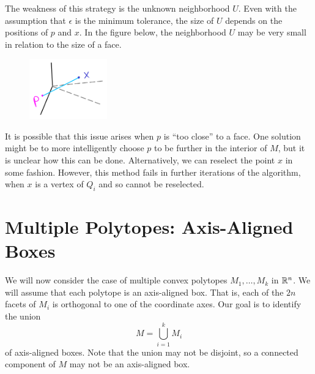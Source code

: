 \documentclass[12pt]{article}
\begin{document}
\begin{flushleft}
The weakness of this strategy is the unknown neighborhood $U$.
Even with the assumption that $\epsilon$ is the minimum tolerance, the size of $U$ depends on the positions of $p$ and $x$.
In the figure below, the neighborhood $U$ may be very small in relation to the size of a face.
\begin{figure}[H]
	\centering
	\includegraphics[width=0.3\textwidth]{epsilon_weakness.png}
\end{figure}
It is possible that this issue arises when $p$ is ``too close'' to a face.
One solution might be to more intelligently choose $p$ to be further in the interior of $M$, but it is unclear how this can be done.
Alternatively, we can reselect the point $x$ in some fashion.
However, this method fails in further iterations of the algorithm, when $x$ is a vertex of $Q_i$ and so cannot be reselected.


\newpage
\section{Multiple Polytopes: Axis-Aligned Boxes}

We will now consider the case of multiple convex polytopes $M_1,\dots, M_k$ in $\mathbb{R}^n$.
We will assume that each polytope is an axis-aligned box.
That is, each of the $2n$ facets of $M_i$ is orthogonal to one of the coordinate axes.
Our goal is to identify the union 
\[M = \bigcup_{i=1}^k M_i\]
of axis-aligned boxes.
Note that the union may not be disjoint, so a connected component of $M$ may not be an axis-aligned box.


\end{flushleft}
\end{document}
